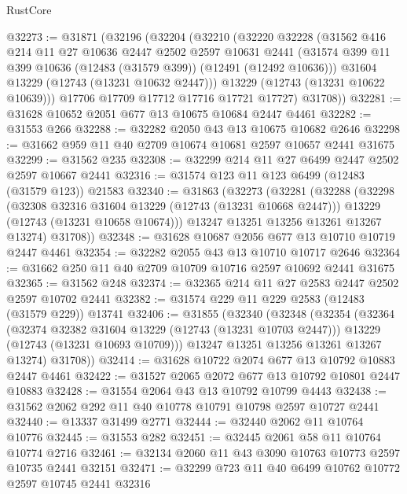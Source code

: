 \begin{lexlean}{RustCore}
\begin{coremodule}
@32273 := @31871
    (@32196
      (@32204
        (@32210
          (@32220
            @32228
            (@31562
              @416
              @214
              @11
              @27
              @10636
              @2447
              @2502
              @2597
              @10631
              @2441
              (@31574 @399 @11 @399 @10636 (@12483 (@31579 @399)) (@12491 (@12492 @10636)))
              @31604
              @13229
              (@12743 (@13231 @10632 @2447)))
            @13229
            (@12743 (@13231 @10622 @10639)))
          @17706
          @17709
          @17712
          @17716
          @17721
          @17727)
        @31708))
@32281 := @31628 @10652 @2051 @677 @13 @10675 @10684 @2447 @4461
@32282 := @31553 @266
@32288 := @32282 @2050 @43 @13 @10675 @10682 @2646
@32298 := @31662 @959 @11 @40 @2709 @10674 @10681 @2597 @10657 @2441 @31675
@32299 := @31562 @235
@32308 := @32299 @214 @11 @27 @6499 @2447 @2502 @2597 @10667 @2441
@32316 := @31574 @123 @11 @123 @6499 (@12483 (@31579 @123)) @21583
@32340 := @31863
    (@32273
      (@32281
        (@32288
          (@32298
            (@32308 @32316 @31604 @13229 (@12743 (@13231 @10668 @2447)))
            @13229
            (@12743 (@13231 @10658 @10674)))
          @13247
          @13251
          @13256
          @13261
          @13267
          @13274)
        @31708))
@32348 := @31628 @10687 @2056 @677 @13 @10710 @10719 @2447 @4461
@32354 := @32282 @2055 @43 @13 @10710 @10717 @2646
@32364 := @31662 @250 @11 @40 @2709 @10709 @10716 @2597 @10692 @2441 @31675
@32365 := @31562 @248
@32374 := @32365 @214 @11 @27 @2583 @2447 @2502 @2597 @10702 @2441
@32382 := @31574 @229 @11 @229 @2583 (@12483 (@31579 @229)) @13741
@32406 := @31855
    (@32340
      (@32348
        (@32354
          (@32364
            (@32374 @32382 @31604 @13229 (@12743 (@13231 @10703 @2447)))
            @13229
            (@12743 (@13231 @10693 @10709)))
          @13247
          @13251
          @13256
          @13261
          @13267
          @13274)
        @31708))
@32414 := @31628 @10722 @2074 @677 @13 @10792 @10883 @2447 @4461
@32422 := @31527 @2065 @2072 @677 @13 @10792 @10801 @2447 @10883
@32428 := @31554 @2064 @43 @13 @10792 @10799 @4443
@32438 := @31562 @2062 @292 @11 @40 @10778 @10791 @10798 @2597 @10727 @2441
@32440 := @13337 @31499 @2771
@32444 := @32440 @2062 @11 @10764 @10776
@32445 := @31553 @282
@32451 := @32445 @2061 @58 @11 @10764 @10774 @2716
@32461 := @32134 @2060 @11 @43 @3090 @10763 @10773 @2597 @10735 @2441 @32151
@32471 := @32299 @723 @11 @40 @6499 @10762 @10772 @2597 @10745 @2441 @32316

\end{coremodule}
\end{lexlean}
